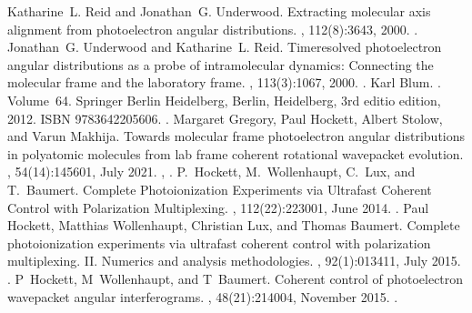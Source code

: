 \documentclass[letterpaper,table,10pt,english]{jupyterBook}
\begin{document}
\begin{sphinxthebibliography}{10}
\sphinxAtStartPar
Katharine L. Reid and Jonathan G. Underwood. Extracting molecular axis alignment from photoelectron angular distributions. , 112(8):3643, 2000. .
\sphinxAtStartPar
Jonathan G. Underwood and Katharine L. Reid. Time\sphinxhyphen{}resolved photoelectron angular distributions as a probe of intramolecular dynamics: Connecting the molecular frame and the laboratory frame. , 113(3):1067, 2000. .
\sphinxAtStartPar
Karl Blum. . Volume 64. Springer Berlin Heidelberg, Berlin, Heidelberg, 3rd editio edition, 2012. ISBN 978\sphinxhyphen{}3\sphinxhyphen{}642\sphinxhyphen{}20560\sphinxhyphen{}6. .
\sphinxAtStartPar
Margaret Gregory, Paul Hockett, Albert Stolow, and Varun Makhija. Towards molecular frame photoelectron angular distributions in polyatomic molecules from lab frame coherent rotational wavepacket evolution. , 54(14):145601, July 2021. , .
\sphinxAtStartPar
P. Hockett, M. Wollenhaupt, C. Lux, and T. Baumert. Complete Photoionization Experiments via Ultrafast Coherent Control with Polarization Multiplexing. , 112(22):223001, June 2014. .
\sphinxAtStartPar
Paul Hockett, Matthias Wollenhaupt, Christian Lux, and Thomas Baumert. Complete photoionization experiments via ultrafast coherent control with polarization multiplexing. II. Numerics and analysis methodologies. , 92(1):013411, July 2015. .
\sphinxAtStartPar
P Hockett, M Wollenhaupt, and T Baumert. Coherent control of photoelectron wavepacket angular interferograms. , 48(21):214004, November 2015. .
\end{sphinxthebibliography}







\renewcommand{\indexname}{Index}
\printindex
\end{document}
